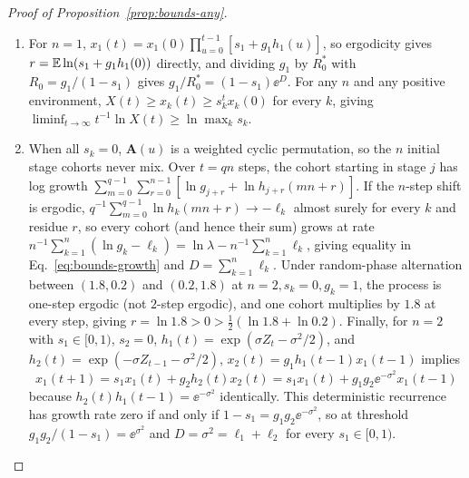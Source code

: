 \begin{proof}[Proof of Proposition~{\upshape\ref{prop:bounds-any}}]
\begin{enumerate}
\item[(b)] For $n = 1$, $x_1(t) = x_1(0)\prod_{u=0}^{t-1} [s_1 + g_1 h_1(u)]$, so ergodicity gives $r = \mathbb{E}\ln(s_1 + g_1 h_1(0))$ directly, and dividing $g_1$ by $R_0^*$ with $R_0 = g_1/(1 - s_1)$ gives $g_1/R_0^* = (1 - s_1)\ee^D$. For any $n$ and any positive environment, $X(t) \ge x_k(t) \ge s_k^t x_k(0)$ for every $k$, giving $\liminf_{t \to \infty} t^{-1}\ln X(t) \ge \ln\max_k s_k$.
\item[(c)] When all $s_k = 0$, $\mathbf{A}(u)$ is a weighted cyclic permutation, so the $n$ initial stage cohorts never mix. Over $t = qn$ steps, the cohort starting in stage $j$ has log growth $\sum_{m=0}^{q-1} \sum_{r=0}^{n-1} [\ln g_{j+r} + \ln h_{j+r}(mn + r)]$. If the $n$-step shift is ergodic, $q^{-1}\sum_{m=0}^{q-1} \ln h_k(mn + r) \to -\ell_k$ almost surely for every $k$ and residue $r$, so every cohort (and hence their sum) grows at rate $n^{-1}\sum_{k=1}^n (\ln g_k - \ell_k) = \ln\lambda - n^{-1}\sum_{k=1}^n \ell_k$, giving equality in Eq.~\eqref{eq:bounds-growth} and $D = \sum_{k=1}^n \ell_k$. Under random-phase alternation between $(1.8, 0.2)$ and $(0.2, 1.8)$ at $n = 2, s_k = 0, g_k = 1$, the process is one-step ergodic (not $2$-step ergodic), and one cohort multiplies by $1.8$ at every step, giving $r = \ln 1.8 > 0 > \frac{1}{2}(\ln 1.8 + \ln 0.2)$. Finally, for $n = 2$ with $s_1 \in [0, 1)$, $s_2 = 0$, $h_1(t) = \exp(\sigma Z_t - \sigma^2/2)$, and $h_2(t) = \exp(-\sigma Z_{t-1} - \sigma^2/2)$, $x_2(t) = g_1 h_1(t - 1) x_1(t - 1)$ implies
\[
x_1(t + 1) = s_1 x_1(t) + g_2 h_2(t) x_2(t) = s_1 x_1(t) + g_1 g_2 \ee^{-\sigma^2} x_1(t - 1)
\]
because $h_2(t)h_1(t - 1) = \ee^{-\sigma^2}$ identically. This deterministic recurrence has growth rate zero if and only if $1 - s_1 = g_1 g_2 \ee^{-\sigma^2}$, so at threshold $g_1 g_2/(1 - s_1) = \ee^{\sigma^2}$ and $D = \sigma^2 = \ell_1 + \ell_2$ for every $s_1 \in [0, 1)$. \qedhere
\end{enumerate}
\end{proof}

